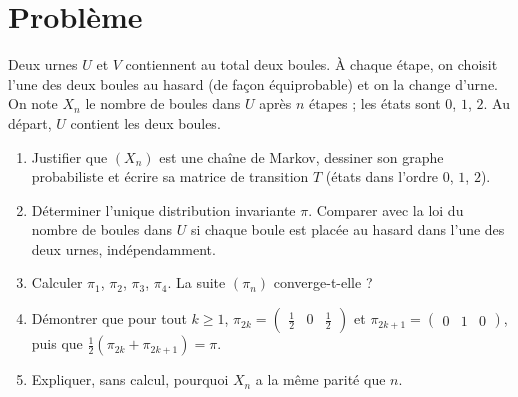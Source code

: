 \section{Problème}
\begin{problem}
Deux urnes $U$ et $V$ contiennent au total deux boules. À chaque étape, on choisit l'une des deux boules au hasard (de façon équiprobable) et on la change d'urne. On note $X_n$ le nombre de boules dans $U$ après $n$ étapes ; les états sont $0$, $1$, $2$. Au départ, $U$ contient les deux boules.
\begin{enumerate}
\item Justifier que $(X_n)$ est une chaîne de Markov, dessiner son graphe probabiliste et écrire sa matrice de transition $T$ (états dans l'ordre $0$, $1$, $2$).
\item Déterminer l'unique distribution invariante $\pi$. Comparer avec la loi du nombre de boules dans $U$ si chaque boule est placée au hasard dans l'une des deux urnes, indépendamment.
\item Calculer $\pi_1$, $\pi_2$, $\pi_3$, $\pi_4$. La suite $(\pi_n)$ converge-t-elle ?
\item Démontrer que pour tout $k\ge1$, $\pi_{2k}=\begin{pmatrix}\frac12&0&\frac12\end{pmatrix}$ et $\pi_{2k+1}=\begin{pmatrix}0&1&0\end{pmatrix}$, puis que $\frac12\left(\pi_{2k}+\pi_{2k+1}\right)=\pi$.
\item Expliquer, sans calcul, pourquoi $X_n$ a la même parité que $n$.
\end{enumerate}
\end{problem}
